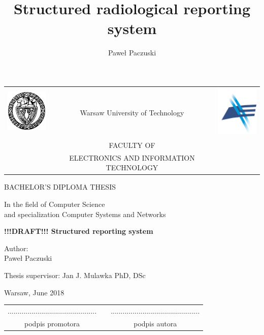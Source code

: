 \documentclass[12pt, twoside, openany]{report}
\author{Paweł Paczuski}
\title{Structured radiological reporting system}
\theoremstyle{definition}
\begin{document}
\begin{titlepage}
\pagestyle{empty}

\noindent
\begin{Large}
\begin{table}[t]
\centering
\begin{tabular}[t]{lcr}
 \includegraphics[width=70pt,height=70pt]{pw} & Warsaw University of Technology & \includegraphics[width=70pt,height=70pt]{elka}\\
& FACULTY OF & \\
& ELECTRONICS AND INFORMATION TECHNOLOGY &
\end{tabular}
\end{table}

\begin{center}BACHELOR'S DIPLOMA THESIS\end{center}
\begin{center}In the field of Computer Science \\ and specialization Computer Systems and Networks \end{center}\end{Large}
\begin{center}
\Huge
\textbf{!!!DRAFT!!! Structured reporting system}
\end{center}
\vfill
\begin{center}
\Large
Author:\\
\LARGE
Paweł Paczuski
\end{center}
\vfill
\begin{center}
\Large
Thesis supervisor: Jan J. Mulawka PhD, DSc
\end{center}
\vfill
\begin{center}
\Large
Warsaw, June 2018
\end{center}
\newpage
\hfill
\begin{table}[b]
\centering
\begin{tabular}[t]{ccc}
............................................. & \hspace*{100pt} & .............................................\\
podpis promotora & \hspace*{100pt} & podpis autora
\end{tabular}
\end{table}


\end{titlepage}
\end{document}
